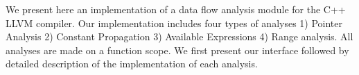 We present here an implementation of a data flow analysis module for the C++ LLVM compiler. Our implementation includes four types of analyses 1) Pointer Analysis 2) Constant Propagation 3) Available Expressions 4) Range analysis. All analyses are made on a function scope. We first present our interface followed by detailed description of the implementation of each analysis.
